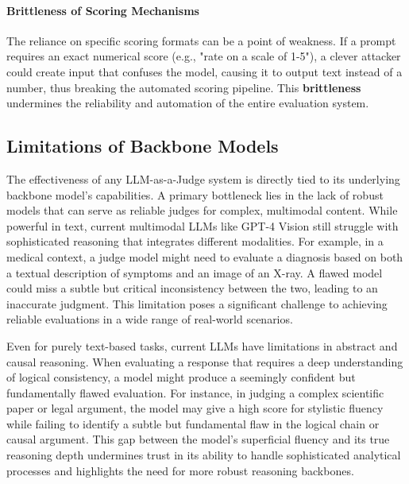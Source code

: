 \paragraph{\textbf{Brittleness of Scoring Mechanisms}}
The reliance on specific scoring formats can be a point of weakness. If a prompt requires an exact numerical score (e.g., "rate on a scale of 1-5"), a clever attacker could create input that confuses the model, causing it to output text instead of a number, thus breaking the automated scoring pipeline. This \textbf{brittleness} undermines the reliability and automation of the entire evaluation system.


\subsection{Limitations of Backbone Models}\label{subsec:challenges_backbone}

The effectiveness of any LLM-as-a-Judge system is directly tied to its underlying backbone model's capabilities. A primary bottleneck lies in the lack of robust models that can serve as reliable judges for complex, multimodal content. While powerful in text, current multimodal LLMs like GPT-4 Vision still struggle with sophisticated reasoning that integrates different modalities. For example, in a medical context, a judge model might need to evaluate a diagnosis based on both a textual description of symptoms and an image of an X-ray. A flawed model could miss a subtle but critical inconsistency between the two, leading to an inaccurate judgment. This limitation poses a significant challenge to achieving reliable evaluations in a wide range of real-world scenarios.

Even for purely text-based tasks, current LLMs have limitations in abstract and causal reasoning. When evaluating a response that requires a deep understanding of logical consistency, a model might produce a seemingly confident but fundamentally flawed evaluation. For instance, in judging a complex scientific paper or legal argument, the model may give a high score for stylistic fluency while failing to identify a subtle but fundamental flaw in the logical chain or causal argument. This gap between the model's superficial fluency and its true reasoning depth undermines trust in its ability to handle sophisticated analytical processes and highlights the need for more robust reasoning backbones.


